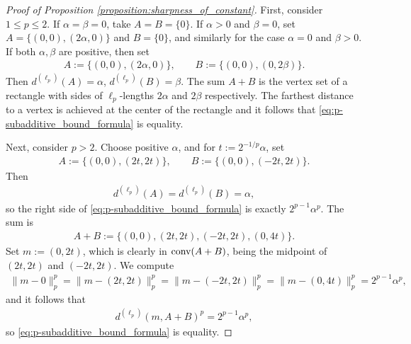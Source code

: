 \documentclass[11pt]{article}
\begin{document}
\begin{proof}[Proof of Proposition \ref{proposition:sharpness_of_constant}]
    First, consider $1\leq p\leq 2$. If $\alpha=\beta=0$, take $A=B=\{0\}$. If $\alpha>0$ and $\beta=0$, set $A=\{(0,0),(2\alpha,0)\}$ and $B=\{0\}$, and similarly for the case $\alpha=0$ and $\beta>0$. If both $\alpha,\beta$ are positive, then set
    \begin{align*}
        A:=\{(0,0),(2\alpha,0)\},\qquad B:=\{(0,0),(0,2\beta)\}.
    \end{align*}
    Then $d^{(\ell_p)}(A)=\alpha$, $d^{(\ell_p)}(B)=\beta$. The sum $A+B$ is the vertex set of a rectangle with sides of $\ell_p$-lengths $2\alpha$ and $2\beta$ respectively. The farthest distance to a vertex is achieved at the center of the rectangle and it follows that \eqref{eq:p-subadditive_bound_formula} is equality.

    Next, consider $p>2$. Choose positive $\alpha$, and for $t:=2^{-1/p}\alpha$, set
    \begin{align*}
        A:=\{(0,0),(2t,2t)\},\qquad B:=\{(0,0),(-2t,2t)\}.
    \end{align*}
    Then
    \begin{align*}
        d^{(\ell_p)}(A)=d^{(\ell_p)}(B)=\alpha,
    \end{align*}
    so the right side of \eqref{eq:p-subadditive_bound_formula} is exactly $2^{p-1}\alpha^p$. The sum is
    \begin{align*}
        A+B:=\{(0,0),(2t,2t),(-2t,2t),(0,4t)\}.
    \end{align*}
    Set $m:=(0,2t)$, which is clearly in $\textup{conv}(A+B)$, being the midpoint of $(2t,2t)$ and $(-2t,2t)$. We compute
    \begin{align*}
        \|m-0\|_p^p=\|m-(2t,2t)\|_p^p=\|m-(-2t,2t)\|_p^p=\|m-(0,4t)\|_p^p=2^{p-1}\alpha^p,
    \end{align*}
    and it follows that
    \begin{align*}
        d^{(\ell_p)}(m,A+B)^p=2^{p-1}\alpha^p,
    \end{align*}
    so \eqref{eq:p-subadditive_bound_formula} is equality.
\end{proof}
\end{document}
